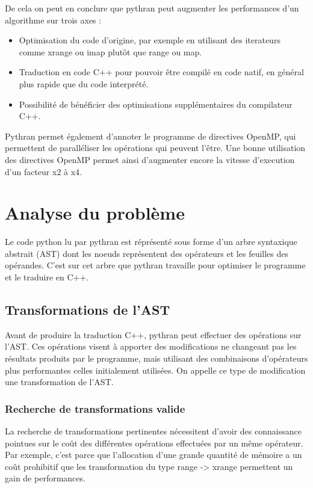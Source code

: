 \documentclass[a4paper]{article}
\begin{document}
De cela on peut en conclure que pythran peut augmenter les performances d'un algorithme sur trois axes :

\begin{itemize}
  \item Optimisation du code d'origine, par exemple en utilisant des iterateurs comme xrange ou imap plutôt que range ou map.
  \item Traduction en code C++ pour pouvoir être compilé en code natif, en général plus rapide que du code interprété.
  \item Possibilité de bénéficier des optimisations supplémentaires du compilateur C++.
\end{itemize}


Pythran permet également d'annoter le programme de directives OpenMP, qui permettent de paralléliser les opérations qui peuvent l'être. Une bonne utilisation des directives OpenMP permet ainsi d'augmenter encore la vitesse d'execution d'un facteur x2 à x4\cite{PythranRenpar}.

\section{Analyse du problème}

Le code python lu par pythran est réprésenté sous forme d'un arbre syntaxique abstrait (AST) dont les noeuds représentent des opérateurs et les feuilles des opérandes. C'est sur cet arbre que pythran travaille pour optimiser le programme et le traduire en C++.

\subsection{Transformations de l'AST}

Avant de produire la traduction C++, pythran peut effectuer des opérations sur l'AST. Ces opérations visent à apporter des modifications ne changeant pas les résultats produits par le programme, mais utilisant des combinaisons d'opérateurs plus performantes celles initialement utilisées. On appelle ce type de modification une transformation de l'AST.

\subsubsection{Recherche de transformations valide}

La recherche de transformations pertinentes nécessitent d'avoir des connaissance pointues sur le coût des différentes opérations effectuées par un même opérateur. Par exemple, c'est parce que l'allocation d'une grande quantité de mémoire a un coût prohibitif que les transformation du type range -> xrange permettent un gain de performances.
\end{document}

